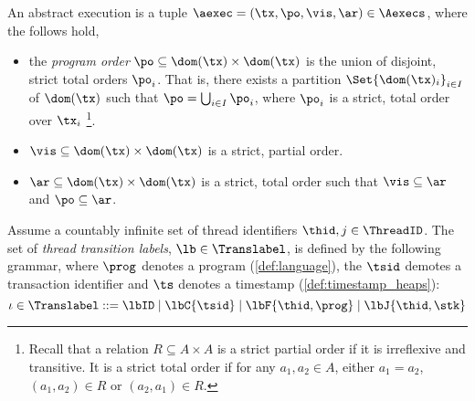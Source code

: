 \begin{defn}
\label{def:abs-exec}
An abstract execution is a tuple $\aexec = (\tx, \po, \vis, \ar) \in \Aexecs$, where the follows hold,

\begin{itemize}
\item
the \emph{program order} $\po \subseteq \dom(\tx) \times \dom(\tx)$ is the union of disjoint, strict total orders \( \po_{i} \).
That is, there exists a partition $\Set{ \dom(\tx)_{i} }_{i \in I}$ of $\dom(\tx)$ such that $\po = \bigcup_{i \in I} \po_{i}$, where $\po_{i}$ is a strict, total order over $\tx_i$%
\footnote{Recall that a relation $R \subseteq A \times A$ is a strict partial order if it is irreflexive and transitive.
It is a strict total order if for any $a_1, a_2 \in A$, either $a_1 = a_2$, $(a_1, a_2) \in R$ or $(a_2, a_1) \in R$.}.


\item 
$\vis \subseteq \dom(\tx) \times \dom(\tx)$ is a strict, partial order.

\item 
$\ar \subseteq \dom(\tx) \times \dom(\tx)$ is a strict, total order such that $\vis \subseteq \ar$ and \( \po \subseteq \ar\).

\end{itemize}

\end{defn}


\begin{defn}
\label{def:label}
Assume a countably infinite set of thread identifiers $\thid,j \in \ThreadID$.
The set of \emph{thread transition labels}, $\lb \in \Translabel$, is defined by the following grammar, where $\prog$ denotes a program (\ref{def:language}), the $\tsid$ demotes a transaction identifier and $\ts$ denotes a timestamp (\ref{def:timestamp_heaps}):
\[
	\iota \in \Translabel ::= \lbID \mid \lbC{\tsid} \mid \lbF{\thid,\prog} \mid \lbJ{\thid,\stk}
\]
\end{defn}


